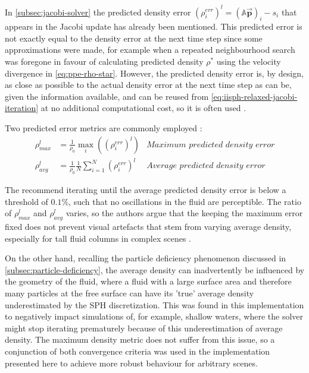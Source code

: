 \documentclass[oneside, a4paper]{book}
\newcommand\vek[1]{\vec{\bm{#1}}}
\newcommand\br[1]{\left(#1\right)}
\begin{document}
  In \autoref{subsec:jacobi-solver} the predicted density error $\br{\rho^{err}_i}^l = \br{\mathds{A}\vek{p}}_i-s_i$ that appears in the Jacobi update has already been mentioned. This predicted error is not exactly equal to the density error at the next time step since some approximations were made, for example when a repeated neighbourhood search was foregone in favour of calculating predicted density $\rho^*$ using the velocity divergence in \autoref{eq:ppe-rho-star}. However, the predicted density error is, by design, as close as possible to the actual density error at the next time step as can be, given the information available, and can be reused from \autoref{eq:iisph-relaxed-jacobi-iteration} at no additional computational cost, so it is often used \autocites{tutorial2019}{iisph}. 

  Two predicted error metrics are commonly employed \autocite{iisph}:
  \begin{align}
    \rho^{l}_{max} &= \frac{1}{\rho_0}\max_i\br{\br{\rho^{err}_i}^l} 
    &\textit{Maximum predicted density error}\\
    \rho^{l}_{avg} &= \frac{1}{\rho_0}\frac{1}{N}\sum_{i=1}^N \br{\rho^{err}_i}^l
    &\textit{Average predicted density error}
  \end{align}

  The \autocite[authors of IISPH]{iisph} recommend iterating until the average predicted density error is below a threshold of $0.1\%$, such that no oscillations in the fluid are perceptible. The ratio of $\rho^{l}_{max}$ and $\rho^{l}_{avg}$ varies, so the authors argue that the keeping the maximum error fixed does not prevent visual artefacts that stem from varying average density, especially for tall fluid columns in complex scenes \autocite{iisph}. 
  
  On the other hand, recalling the particle deficiency phenomenon discussed in \autoref{subsec:particle-deficiency}, the average density can inadvertently be influenced by the geometry of the fluid, where a fluid with a large surface area and therefore many particles at the free surface can have its 'true' average density underestimated by the SPH discretization. This was found in this implementation to negatively impact simulations of, for example, shallow waters, where the solver might stop iterating prematurely because of this underestimation of average density. The maximum density metric does not suffer from this issue, so a conjunction of both convergence criteria was used in the implementation presented here to achieve more robust behaviour for arbitrary scenes. 
\end{document}
